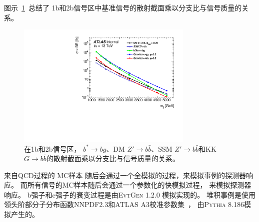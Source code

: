 
图示~\ref{fig:Data3}~总结了
1b和2b信号区中基准信号的散射截面乘以分支比与信号质量的关系。

\begin{figure}[thbp]
  \centering
  \includegraphics[width=0.75\textwidth]{figuresDijet/03-BenchmarkSignals/taggedSignal_xs.pdf}
  \caption{ 
  在1b和2b信号区，
  $b^* \to bg$、DM $Z\prime \to b\bar{b}$、SSM $Z\prime \to b\bar{b}$和KK $G \to b\bar{b}$的散射截面乘以分支比与信号质量的关系。
  }
  \label{fig:Data3}
\end{figure}

来自QCD过程的
MC样本
随后会通过一个全模拟的过程，来模拟事例的探测器响应。
而所有信号的MC样本随后会通过一个参数化的快模拟过程，
来模拟探测器响应。
b强子和c强子的衰变过程是由\textsc{EvtGen 1.2.0}
模拟实现的。
堆积事例是使用领头阶部分子分布函数NNPDF2.3和\textsc{ATLAS A3}校准参数集~\cite{ATL-PHYS-PUB-2016-017}，
由\textsc{Pythia 8.186}模拟产生的。



